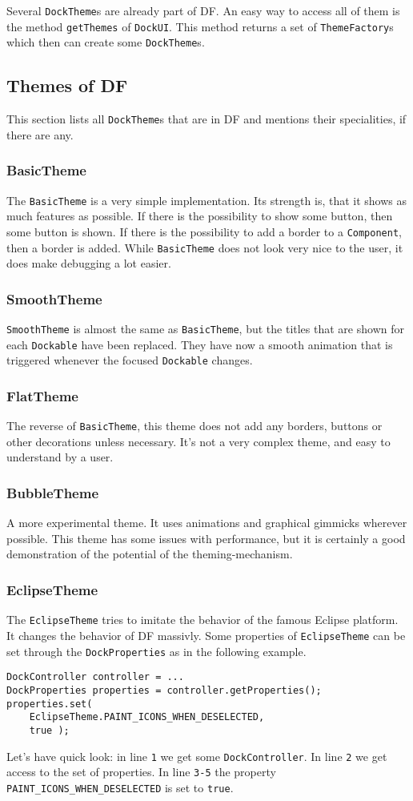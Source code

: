 \documentclass[a4paper,10pt]{article}
\newcommand{\src}[1]{\lstinline[basicstyle=\normalsize\ttfamily,keywordstyle=\normalsize\ttfamily,identifierstyle=\normalsize\ttfamily]|#1|}
\begin{document}
Several \src{DockTheme}s are already part of DF. An easy way to access all of them is the method \src{getThemes} of \src{DockUI}. This method returns a set of \src{ThemeFactory}s which then can create some \src{DockTheme}s.

\subsection{Themes of DF}
This section lists all \src{DockTheme}s that are in DF and mentions their specialities, if there are any.
\subsubsection{BasicTheme}
The \src{BasicTheme} is a very simple implementation. Its strength is, that it shows as much features as possible. If there is the possibility to show some button, then some button is shown. If there is the possibility to add a border to a \src{Component}, then a border is added. While \src{BasicTheme} does not look very nice to the user, it does make debugging a lot easier.
\subsubsection{SmoothTheme}
\src{SmoothTheme} is almost the same as \src{BasicTheme}, but the titles that are shown for each \src{Dockable} have been replaced. They have now a smooth animation that is triggered whenever the focused \src{Dockable} changes.
\subsubsection{FlatTheme}
The reverse of \src{BasicTheme}, this theme does not add any borders, buttons or other decorations unless necessary. It's not a very complex theme, and easy to understand by a user.
\subsubsection{BubbleTheme}
A more experimental theme. It uses animations and graphical gimmicks wherever possible. This theme has some issues with performance, but it is certainly a good demonstration of the potential of the theming-mechanism.
\subsubsection{EclipseTheme} \label{EclipseTheme}
The \src{EclipseTheme} tries to imitate the behavior of the famous Eclipse platform. It changes the behavior of DF massivly. Some properties of \src{EclipseTheme} can be set through the \src{DockProperties} as in the following example.
\begin{lstlisting}
DockController controller = ...
DockProperties properties = controller.getProperties();
properties.set(
	EclipseTheme.PAINT_ICONS_WHEN_DESELECTED,
	true );
\end{lstlisting}
Let's have quick look: in line \src{1} we get some \src{DockController}. In line \src{2} we get access to the set of properties. In line \src{3-5} the property \\\src{PAINT_ICONS_WHEN_DESELECTED} is set to \src{true}.
\end{document}
